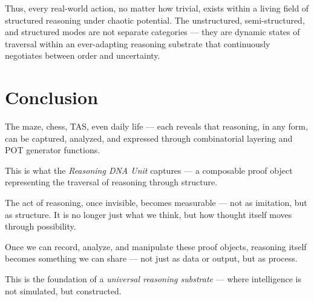 \documentclass[11pt]{article}
\begin{document}
Thus, every real-world action, no matter how trivial, exists within a living field of structured reasoning under chaotic potential. The unstructured, semi-structured, and structured modes are not separate categories --- they are dynamic states of traversal within an ever-adapting reasoning substrate that continuously negotiates between order and uncertainty.

\section{Conclusion}

The maze, chess, TAS, even daily life --- each reveals that reasoning, in any form, can be captured, analyzed, and expressed through combinatorial layering and POT generator functions.

This is what the \textit{Reasoning DNA Unit} captures --- a composable proof object representing the traversal of reasoning through structure.

The act of reasoning, once invisible, becomes measurable --- not as imitation, but as structure. It is no longer just what we think, but how thought itself moves through possibility.

Once we can record, analyze, and manipulate these proof objects, reasoning itself becomes something we can share --- not just as data or output, but as process.

This is the foundation of a \textit{universal reasoning substrate} --- where intelligence is not simulated, but constructed.
\end{document}
